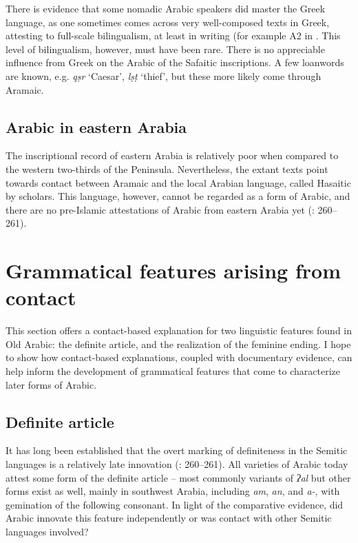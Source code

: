 \documentclass[output=paper]{langsci/langscibook}
\begin{document}
There is evidence that some nomadic Arabic speakers did master the Greek language, as one sometimes comes across very well-composed texts in Greek, attesting to full-scale bilingualism, at least in writing (for example A2 in \citet{Al-Jalladal-Manaser2015}. This level of bilingualism, however, must have been rare. There is no appreciable influence from Greek on the Arabic of the Safaitic inscriptions. A few loanwords are known, e.g. \textit{qṣr} ‘Caesar’, \textit{lṣṭ} ‘thief', but these more likely come through Aramaic.

\subsection{Arabic in eastern Arabia}
The inscriptional record of eastern Arabia is relatively poor when compared to the western two-thirds of the Peninsula. Nevertheless, the extant texts point towards contact between Aramaic and the local Arabian language, called Hasaitic by scholars. This language, however, cannot be regarded as a form of Arabic, and there are no pre-Islamic attestations of Arabic from eastern Arabia yet (\citealt{Al-Jallad2018ANA}: 260--261). 

\section{Grammatical features arising from contact}
This section offers a contact-based explanation for two linguistic features found in Old Arabic: the definite article, and the realization of the feminine ending. I hope to show how contact-based explanations, coupled with documentary evidence, can help inform the development of grammatical features that come to characterize later forms of Arabic.

\subsection{Definite article}
It has long been established that the overt marking of definiteness in the Semitic languages is a relatively late innovation (\citealt{HuehnergardRubin2011}: 260--261). All varieties of Arabic today attest some form of the definite article -- most commonly variants of \textit{ʔal} but other forms exist as well, mainly in southwest Arabia, including \textit{am}, \textit{an}, and \textit{a-}, with gemination of the following consonant. In light of the comparative evidence, did Arabic innovate this feature independently or was contact with other Semitic languages involved?
\end{document}
